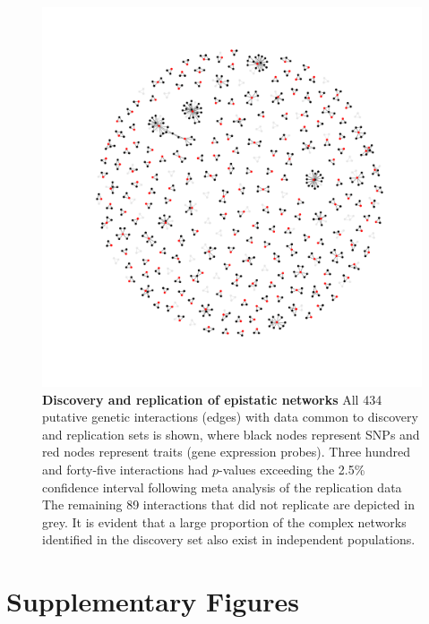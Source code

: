 \documentclass{article}
\begin{document}
\begin{figure}[H]
	\centering
	\includegraphics[width=5in]{pale_gray_graph_of_interactions_2_lists_GrayEdges}
	\caption{\textbf{Discovery and replication of epistatic networks} All 434 putative genetic interactions (edges) with data common to discovery and replication sets is shown, where black nodes represent SNPs and red nodes represent traits (gene expression probes). Three hundred and forty-five interactions had $p$-values exceeding the 2.5\% confidence interval following meta analysis of the replication data The remaining 89 interactions that did not replicate are depicted in grey. It is evident that a large proportion of the complex networks identified in the discovery set also exist in independent populations.}
	\label{fig:fireworks}
\end{figure}

\clearpage


\clearpage


\section*{Supplementary Figures}
\setcounter{figure}{0}
\makeatletter 
\renewcommand{\thefigure}{S\@arabic\c@figure} 
\makeatletter 
\end{document}
